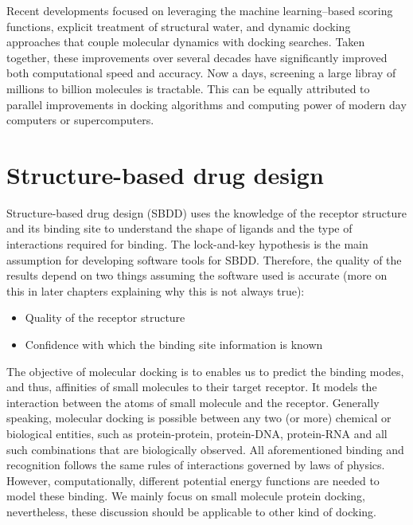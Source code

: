 Recent developments focused on leveraging the machine learning–based scoring functions, explicit treatment of structural water, and dynamic docking approaches that couple molecular dynamics with docking searches\cite{CH1_10}. Taken together, these improvements over several decades have significantly improved both computational speed and accuracy. Now a days, screening a large libray of millions to billion molecules is tractable. This can be equally attributed to parallel improvements in docking algorithms and computing power of modern day computers or supercomputers.

\section{Structure-based drug design}
Structure-based drug design (SBDD) uses the knowledge of the receptor structure and its binding site  to understand the shape of ligands and the type of interactions required for binding. The lock-and-key hypothesis is the main assumption for developing software tools for SBDD. Therefore, the quality of the results depend on two things assuming the software used is accurate (more on this in later chapters explaining why this is not always true):
\begin{itemize}
    \item Quality of the receptor structure
    \item Confidence with which the binding site information is known
\end{itemize}
The objective of molecular docking is to enables us to predict the binding modes, and thus, affinities of small molecules to their target receptor. It models the interaction between the atoms of small molecule and the receptor. Generally speaking, molecular docking is possible between any two (or more) chemical or biological entities, such as protein-protein, protein-DNA, protein-RNA and all such combinations that are biologically observed. All aforementioned binding and recognition follows the same rules of interactions governed by laws of physics. However, computationally, different potential energy functions are needed to model these binding. We  mainly focus on small molecule protein docking, nevertheless, these discussion should be applicable to other kind of docking. 

